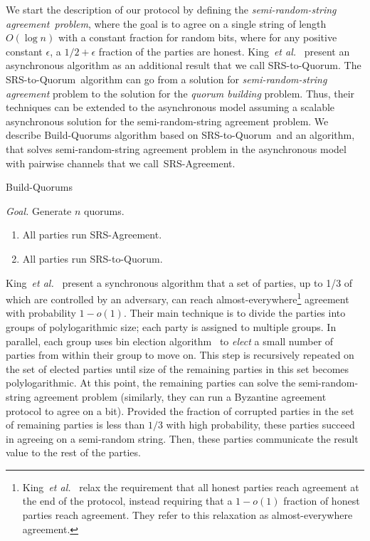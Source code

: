 \documentclass[11pt,letter]{article}
\newcommand{\etal}{\emph{et al.}}
\theoremstyle{mytheoremstyle}
\let\savedCaption=\caption
\renewcommand*{\caption}[1]{\savedCaption[#1]{~#1}}
\newcommand{\algfont}{}
\newcommand{\rs}{semi-random-string agreement\xspace}
\newcommand{\binelection}{{bin election}\xspace}
\newcommand{\rsAlg}{\mbox{\textsf{SRS-Agreement}}\xspace}
\newcommand{\rsToQ}{\mbox{\textsf{SRS-to-Quorum}}\xspace}
\begin{document}
We start the description of our protocol by defining the \emph{\rs\ problem}, where the goal is to agree on a single string of length $O(\log{n})$ with a constant fraction for random bits, where for any positive constant $\epsilon$, a $1/2+\epsilon$ fraction of the parties are honest. 
King~\etal~\cite{ICDCN11} present an asynchronous algorithm as an additional result that we call \rsToQ. The \rsToQ\ algorithm can go from a solution for \emph{\rs} problem to the solution for the \emph{quorum building} problem. Thus, their techniques can be extended to the asynchronous model assuming a scalable asynchronous solution for the \rs problem. We describe \textsf{Build-Quorums} algorithm based on \rsToQ\ and an algorithm, that solves \rs problem in the asynchronous model with pairwise channels that we call~\rsAlg.

\begin{algorithm}
	\caption{\textsf{Build-Quorums}}
	\label{pro:cq}
	\medskip
	\algfont
	\textit{Goal.} Generate $n$ quorums.
	
	\begin{enumerate}
		\item All parties run \rsAlg.
		\item All parties run \rsToQ.
	\end{enumerate}
\end{algorithm}

King~\etal~\cite{King:2006:TSS:1170136.1170491} present a synchronous algorithm that a set of parties, up to 1/3 of which are controlled by an adversary, can reach almost-everywhere\footnote{King~\etal~\cite{King:2006:TSS:1170136.1170491} relax the requirement that all honest parties reach agreement at the end of the protocol, instead requiring that a $1- o(1)$ fraction of honest parties reach agreement. They refer to this relaxation as almost-everywhere agreement.} agreement with probability $1 - o(1)$.
Their main technique is to divide the parties into groups of polylogarithmic size; each party is assigned to multiple groups. In parallel, each group uses \binelection algorithm~\cite{Feige} to \emph{elect} a small number of parties from within their group to move on.
This step is recursively repeated on the set of elected parties until size of the remaining parties in this set becomes polylogarithmic. At this point, the remaining parties can solve the \rs problem (similarly, they can run a Byzantine agreement protocol to agree on a bit). Provided the fraction of corrupted parties in the set of remaining parties is less than $1/3$ with high probability, these parties succeed in agreeing on a semi-random string. Then, these parties communicate the result value to the rest of the parties.
\end{document}
